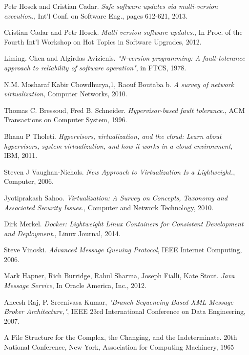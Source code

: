 \documentclass[a4paper,11pt,twoside]{report}
\begin{document}
\begin{thebibliography}{1}
  Petr Hosek and Cristian Cadar. {\em Safe software updates via multi-version execution.}, Int'l Conf. on Software Eng., pages 612-621, 2013.
 
  Cristian Cadar and Petr Hosek. {\em Multi-version software updates.}, In Proc. of the Fourth Int'l Workshop on Hot Topics in Software Upgrades, 2012.

 	 Liming. Chen and Algirdas Avizienis. {\em  "N-version programming: A fault-tolerance approach to reliability of software operation"}, in FTCS, 1978. 
   
	 N.M. Mosharaf Kabir Chowdhurya,1, Raouf Boutaba b. {\em A survey of network virtualization}, Computer Networks, 2010.
   
	 Thomas C. Bressoud, Fred B. Schneider. {\em Hypervisor-based fault tolerance.}, ACM 	Transactions on Computer System, 1996.
	   
  	 Bhanu P Tholeti. {\em Hypervisors, virtualization, and the cloud: Learn about hypervisors, system virtualization, and how it works in a cloud environment}, IBM, 2011. 

	  Steven J Vaughan-Nichols. {\em New Approach to Virtualization Is a Lightweight.}, Computer, 2006.  
	 
	   Jyotiprakash Sahoo. {\em Virtualization: A Survey on Concepts, Taxonomy and Associated Security Issues.}, Computer and Network Technology, 2010.
  
    Dirk Merkel. {\em Docker: Lightweight Linux Containers for Consistent Development and Deployment.}, Linux Journal, 2014.
	
	 Steve Vinoski. {\em Advanced Message Queuing Protocol}, IEEE Internet Computing, 2006. 

     Mark Hapner, Rich Burridge, Rahul Sharma, Joseph Fialli, Kate Stout. {\em Java Message Service}, In Oracle America, Inc., 2012.

 Aneesh Raj, P. Sreenivasa Kumar, {\em "Branch Sequencing Based XML Message Broker Architecture,"}, IEEE 23rd International Conference on Data Engineering, 2007.  

 A File Structure for the Complex, the Changing, and the Indeterminate. 20th National Conference, New York, Association for Computing Machinery, 1965
\end{thebibliography} 
\end{document}
